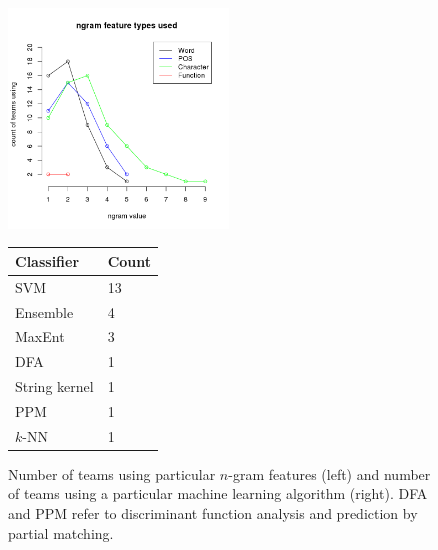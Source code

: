 \begin{figure}[t]
\begin{center}
\begin{minipage}[c]{.45\textwidth}
    \begin{center}
    \includegraphics[width=2.3in]{ngram-comp}
    \end{center}
\end{minipage}
\hfill
\begin{minipage}[c]{.45\textwidth}
    \begin{center}
    \begin{tabular}{ll}
    \hline
    \hline
    \textbf{Classifier} & \textbf{Count} \\
    \hline
    SVM & 13 \\
    Ensemble & 4 \\
    MaxEnt & 3 \\
    DFA & 1 \\
    String kernel & 1 \\
    PPM & 1 \\
    $k$-NN & 1 \\
    \hline
    \hline
    \end{tabular}
    \end{center}
\end{minipage}
\caption{Number of teams using particular $n$-gram features (left) and number of
teams using a particular machine learning algorithm (right). DFA and PPM refer
to discriminant function analysis and prediction by partial matching.}
\label{fig:ngram-comp}
\end{center}
\end{figure}
